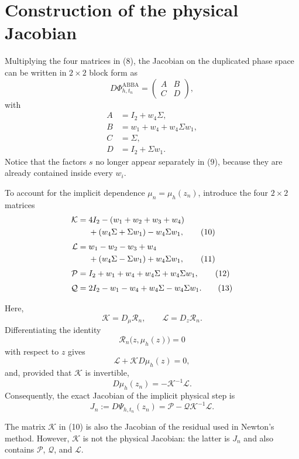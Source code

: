 \documentclass[11pt,a4paper]{article}
\newcommand{\PhiAB}{\Phi^{\mathrm{ABBA}}_{h,t_n}}
\begin{document}
\section{Construction of the physical Jacobian}

Multiplying the four matrices in (8), the Jacobian on the duplicated phase space can be
written in $2\times2$ block form as
\[
 D\PhiAB=
 \begin{pmatrix}
  A&B\\ C&D
 \end{pmatrix},
\]
with
\begin{align}
 A&=I_2+w_4\Sigma, \tag{9a}\\
 B&=w_1+w_4+w_4\Sigma w_1, \tag{9b}\\
 C&=\Sigma, \tag{9c}\\
 D&=I_2+\Sigma w_1. \tag{9d}
\end{align}
Notice that the factors $s$ no longer appear separately in (9), because they are already
contained inside every $w_i$.

To account for the implicit dependence $\mu_n=\mu_h(z_n)$, introduce the four
$2\times2$ matrices
\begin{align}
 \mathcal K={}&4I_2-(w_1+w_2+w_3+w_4) \notag\\
 &+(w_4\Sigma+\Sigma w_1)-w_4\Sigma w_1, \tag{10}\\[1mm]
 \mathcal L={}&w_1-w_2-w_3+w_4 \notag\\
 &+(w_4\Sigma-\Sigma w_1)+w_4\Sigma w_1, \tag{11}\\[1mm]
 \mathcal P={}&I_2+w_1+w_4+w_4\Sigma+w_4\Sigma w_1, \tag{12}\\[1mm]
 \mathcal Q={}&2I_2-w_1-w_4+w_4\Sigma-w_4\Sigma w_1. \tag{13}
\end{align}

Here,
\[
 \mathcal K=D_\mu\mathcal R_n,
 \qquad
 \mathcal L=D_z\mathcal R_n.
\]
Differentiating the identity
\[
 \mathcal R_n\bigl(z,\mu_h(z)\bigr)=0
\]
with respect to $z$ gives
\[
 \mathcal L+\mathcal K D\mu_h(z)=0,
\]
and, provided that $\mathcal K$ is invertible,
\[
 D\mu_h(z_n)=-\mathcal K^{-1}\mathcal L.
\]
Consequently, the exact Jacobian of the implicit physical step is
\[
 \boxed{
 J_n:=D\Psi_{h,t_n}(z_n)
 =\mathcal P-\mathcal Q\mathcal K^{-1}\mathcal L.
 }
 \tag{14}
\]

The matrix $\mathcal K$ in (10) is also the Jacobian of the residual used in Newton's
method. However, $\mathcal K$ is not the physical Jacobian: the latter is $J_n$ and also
contains $\mathcal P$, $\mathcal Q$, and $\mathcal L$.
\end{document}
